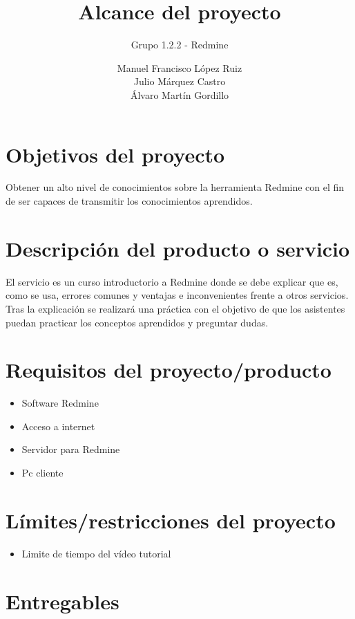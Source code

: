 \documentclass[a4paper,10pt]{scrartcl}
\title{Alcance del proyecto}
\subtitle{Grupo 1.2.2 - Redmine}
\author{
		Manuel Francisco López Ruiz\\
		Julio Márquez Castro\\
		Álvaro Martín Gordillo\\
		  }
\begin{document}
\clearpage\maketitle
\thispagestyle{empty}
\newpage

\tableofcontents

\newpage



\section{Objetivos del proyecto}

Obtener un alto nivel de conocimientos sobre la herramienta Redmine con el fin de ser capaces de transmitir los conocimientos aprendidos.

\section{Descripción del producto o servicio}

El servicio es un curso introductorio a Redmine donde se debe explicar que es, como se usa, errores comunes y ventajas e inconvenientes frente a otros servicios. Tras la explicación se realizará una práctica con el objetivo de que los asistentes puedan practicar los conceptos aprendidos y preguntar dudas.

\section{Requisitos del proyecto/producto}

\begin{itemize}
	\item Software Redmine
	\item Acceso a internet
	\item Servidor para Redmine
	\item Pc cliente
\end{itemize}

\section{Límites/restricciones del proyecto}

\begin{itemize}
	\item Limite de tiempo del vídeo tutorial
\end{itemize}

\section{Entregables}
\end{document}

